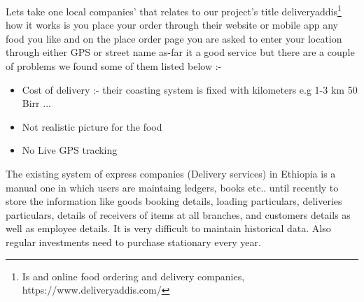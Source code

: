 Lets take one local companies' that relates to our project's title deliveryaddis\footnote{Is and online food ordering and delivery companies, https://www.deliveryaddis.com/} how it works is you place your order through their website or mobile app any food you like and on the place order page you are asked to enter your location through either GPS or street name as-far it a good service but there are a couple of problems we found some of them listed below :-

\begin{itemize}
	\item Cost of delivery :- their coasting system is fixed with kilometers e.g 1-3 km 50 Birr ...
	\item Not realistic picture for the food
	\item No Live GPS tracking
\end{itemize}

The existing system of express companies (Delivery services) in Ethiopia is a manual one in which users are maintaing ledgers, books etc.. until recently to store the information like goods booking details, loading particulars, deliveries particulars, details of receivers of items at all branches, and customers details as well as employee details. It is very difficult to maintain historical data. Also regular investments need to purchase stationary every year.

